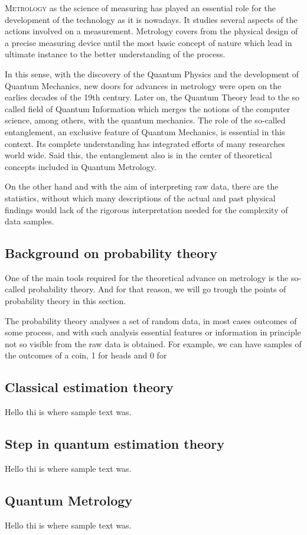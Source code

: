 
\lettrine[lines=2, findent=3pt,nindent=0pt]{M}{etrology} as the science of measuring has played an essential role for the development of the technology as it is nowadays.
It studies several aspects of the actions involved on a measurement. 
Metrology covers from the physical design of a precise measuring device until the most basic concept of nature which lead in ultimate instance to the better understanding of the process. 

In this sense, with the discovery of the Quantum Physics and the development of Quantum Mechanics, new doors for advances in metrology were open on the earlies decades of the 19th century.
Later on, the Quantum Theory lead to the so called field of Quantum Information which merges the notions of the computer science, among others, with the quantum mechanics.
The role of the so-called entanglement, an exclusive feature of Quantum Mechanics, is essential in this context.
Its complete understanding has integrated efforts of many researches world wide.
Said this, the entanglement also is in the center of theoretical concepts included in Quantum Metrology.

On the other hand and with the aim of interpreting raw data, there are the statistics, without which many descriptions of the actual and past physical findings would lack of the rigorous interpretation needed for the complexity of data samples.



\subsection{Background on probability theory}
One of the main tools required for the theoretical advance on metrology is the so-called probability theory.
And for that reason, we will go trough the points of probability theory in this section.

The probability theory analyses a set of random data, in most cases outcomes of some process, and with such analysis essential features or information in principle not so visible from the raw data is obtained. For example, we can have samples of the outcomes of a coin, 1 for heads and 0 for 


\subsection{Classical estimation theory}
Hello thi is where sample text was.

\subsection{Step in quantum estimation theory}
Hello thi is where sample text was.

\subsection{Quantum Metrology}
Hello thi is where sample text was.